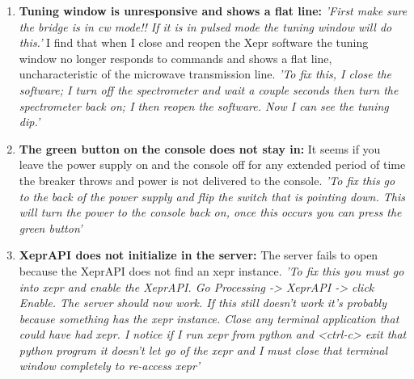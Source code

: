 \documentclass{article}
\newcommand{\fc}[1]{{\color{blue}\textit{'{#1}'}}}
\begin{document}
\begin{enumerate}
    \item {\bf Tuning window is unresponsive and shows a flat line:} \fc{First make sure the bridge is in cw mode!! If it is in pulsed mode the tuning window will do this.} I find that when I close and reopen the Xepr software the tuning window no longer responds to commands and shows a flat line, uncharacteristic of the microwave transmission line. \fc{To fix this, I close the software; I turn off the spectrometer and wait a couple seconds then turn the spectrometer back on; I then reopen the software. Now I can see the tuning dip.}

\item {\bf The green button on the console does not stay in:} It seems if you leave the power supply on and the console off for any extended period of time the breaker throws and power is not delivered to the console. \fc{To fix this go to the back of the power supply and flip the switch that is pointing down. This will turn the power to the console back on, once this occurs you can press the green button}

\item {\bf XeprAPI does not initialize in the server:} The server fails to open because the XeprAPI does not find an xepr instance. \fc{To fix this you must go into xepr and enable the XeprAPI. Go Processing -> XeprAPI -> click Enable. The server should now work. If this still doesn't work it's probably because something has the xepr instance. Close any terminal application that could have had xepr. I notice if I run xepr from python and <ctrl-c> exit that python program it doesn't let go of the xepr and I must close that terminal window completely to re-access xepr}

\end{enumerate}

{}

\end{document}
